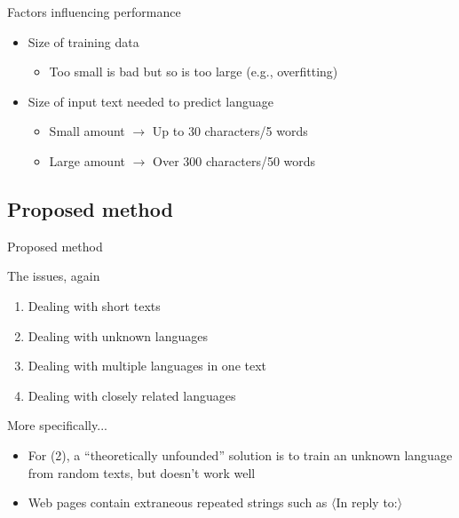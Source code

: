 \documentclass{beamer}
\newcommand{\orth}[1]{
    $\langle$#1$\rangle$
  }
\begin{document}
      \begin{frame}{\subsix}
        \begin{block}{Factors influencing performance}
          \begin{itemize}
            \item Size of training data
            \begin{itemize}
              \item Too small is bad but so is too large (e.g., overfitting)
            \end{itemize}
            \item Size of input text needed to predict language
            \begin{itemize}
              \item Small amount $\to$ Up to 30 characters/5 words
              \item Large amount $\to$ Over 300 characters/50 words
            \end{itemize}
          \end{itemize}
        \end{block}
      \end{frame}

    \newcommand{\subseven}{Proposed method}
    \subsection{\subseven}
      \begin{frame}{\subseven}
        \begin{block}{The issues, again}
          \begin{enumerate}
            \item Dealing with short texts
            \item Dealing with unknown languages
            \item Dealing with multiple languages in one text
            \item Dealing with closely related languages
          \end{enumerate}
        \end{block}
        \begin{block}{More specifically...}
          \begin{itemize}
            \item For (2), a ``theoretically unfounded'' solution is to train an unknown language from random texts, but doesn't work well
            \item Web pages contain extraneous repeated strings such as \orth{In reply to:}
          \end{itemize}
        \end{block}
      \end{frame}
\end{document}

